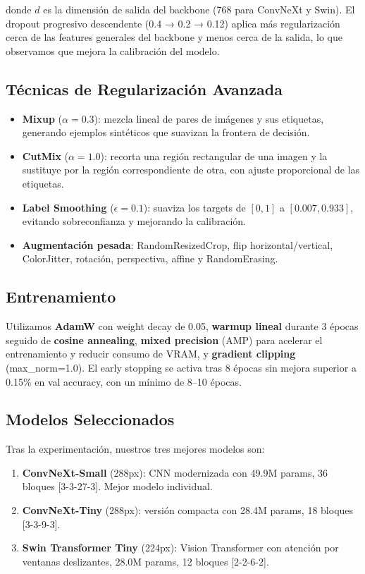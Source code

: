 \documentclass[10pt,a4paper,twocolumn]{article}
\begin{document}
\noindent donde $d$ es la dimensión de salida del backbone (768 para ConvNeXt y Swin). El dropout progresivo descendente (0.4 → 0.2 → 0.12) aplica más regularización cerca de las features generales del backbone y menos cerca de la salida, lo que observamos que mejora la calibración del modelo.

\subsection{Técnicas de Regularización Avanzada}

\begin{itemize}
    \item \textbf{Mixup} ($\alpha=0.3$): mezcla lineal de pares de imágenes y sus etiquetas, generando ejemplos sintéticos que suavizan la frontera de decisión.
    \item \textbf{CutMix} ($\alpha=1.0$): recorta una región rectangular de una imagen y la sustituye por la región correspondiente de otra, con ajuste proporcional de las etiquetas.
    \item \textbf{Label Smoothing} ($\epsilon=0.1$): suaviza los targets de $[0,1]$ a $[0.007, 0.933]$, evitando sobreconfianza y mejorando la calibración.
    \item \textbf{Augmentación pesada}: RandomResizedCrop, flip horizontal/vertical, ColorJitter, rotación, perspectiva, affine y RandomErasing.
\end{itemize}

\subsection{Entrenamiento}

Utilizamos \textbf{AdamW} con weight decay de 0.05, \textbf{warmup lineal} durante 3 épocas seguido de \textbf{cosine annealing}, \textbf{mixed precision} (AMP) para acelerar el entrenamiento y reducir consumo de VRAM, y \textbf{gradient clipping} (max\_norm=1.0). El early stopping se activa tras 8 épocas sin mejora superior a 0.15\% en val accuracy, con un mínimo de 8--10 épocas.

\subsection{Modelos Seleccionados}

Tras la experimentación, nuestros tres mejores modelos son:

\begin{enumerate}
    \item \textbf{ConvNeXt-Small} (288px): CNN modernizada con 49.9M params, 36 bloques [3-3-27-3]. Mejor modelo individual.
    \item \textbf{ConvNeXt-Tiny} (288px): versión compacta con 28.4M params, 18 bloques [3-3-9-3].
    \item \textbf{Swin Transformer Tiny} (224px): Vision Transformer con atención por ventanas deslizantes, 28.0M params, 12 bloques [2-2-6-2].
\end{enumerate}
\end{document}
